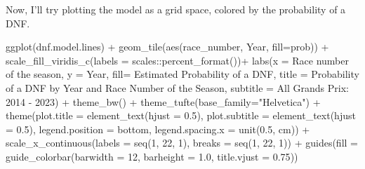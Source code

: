 \documentclass[
]{book}
\newenvironment{Shaded}{\begin{snugshade}}{\end{snugshade}}
\newcommand{\AttributeTok}[1]{\textcolor[rgb]{0.77,0.63,0.00}{#1}}
\newcommand{\DecValTok}[1]{\textcolor[rgb]{0.00,0.00,0.81}{#1}}
\newcommand{\FloatTok}[1]{\textcolor[rgb]{0.00,0.00,0.81}{#1}}
\newcommand{\FunctionTok}[1]{\textcolor[rgb]{0.00,0.00,0.00}{#1}}
\newcommand{\NormalTok}[1]{#1}
\newcommand{\SpecialCharTok}[1]{\textcolor[rgb]{0.00,0.00,0.00}{#1}}
\newcommand{\StringTok}[1]{\textcolor[rgb]{0.31,0.60,0.02}{#1}}
\begin{document}
Now, I'll try plotting the model as a grid space, colored by the probability of a DNF.

\begin{Shaded}
\begin{Highlighting}[]
\FunctionTok{ggplot}\NormalTok{(dnf.model.lines) }\SpecialCharTok{+}
  \FunctionTok{geom\_tile}\NormalTok{(}\FunctionTok{aes}\NormalTok{(race\_number, Year, }\AttributeTok{fill=}\NormalTok{prob)) }\SpecialCharTok{+}
  \FunctionTok{scale\_fill\_viridis\_c}\NormalTok{(}\AttributeTok{labels =}\NormalTok{ scales}\SpecialCharTok{::}\FunctionTok{percent\_format}\NormalTok{())}\SpecialCharTok{+}
  \FunctionTok{labs}\NormalTok{(}\AttributeTok{x =} \StringTok{\textquotesingle{}Race number of the season\textquotesingle{}}\NormalTok{, }
       \AttributeTok{y =} \StringTok{\textquotesingle{}Year\textquotesingle{}}\NormalTok{,}
       \AttributeTok{fill=} \StringTok{\textquotesingle{}Estimated Probability of a DNF\textquotesingle{}}\NormalTok{,}
       \AttributeTok{title =} \StringTok{\textquotesingle{}Probability of a DNF by Year and Race Number of the Season\textquotesingle{}}\NormalTok{,}
       \AttributeTok{subtitle =} \StringTok{\textquotesingle{}All Grands Prix: 2014 {-} 2023\textquotesingle{}}\NormalTok{) }\SpecialCharTok{+}
  \FunctionTok{theme\_bw}\NormalTok{() }\SpecialCharTok{+} 
  \FunctionTok{theme\_tufte}\NormalTok{(}\AttributeTok{base\_family=}\StringTok{"Helvetica"}\NormalTok{)  }\SpecialCharTok{+}
  \FunctionTok{theme}\NormalTok{(}\AttributeTok{plot.title =} \FunctionTok{element\_text}\NormalTok{(}\AttributeTok{hjust =} \FloatTok{0.5}\NormalTok{),}
        \AttributeTok{plot.subtitle =} \FunctionTok{element\_text}\NormalTok{(}\AttributeTok{hjust =} \FloatTok{0.5}\NormalTok{),}
        \AttributeTok{legend.position =} \StringTok{\textquotesingle{}bottom\textquotesingle{}}\NormalTok{, }
        \AttributeTok{legend.spacing.x =} \FunctionTok{unit}\NormalTok{(}\FloatTok{0.5}\NormalTok{, }\StringTok{\textquotesingle{}cm\textquotesingle{}}\NormalTok{))  }\SpecialCharTok{+}
  \FunctionTok{scale\_x\_continuous}\NormalTok{(}\AttributeTok{labels =} \FunctionTok{seq}\NormalTok{(}\DecValTok{1}\NormalTok{, }\DecValTok{22}\NormalTok{, }\DecValTok{1}\NormalTok{),}
                     \AttributeTok{breaks =} \FunctionTok{seq}\NormalTok{(}\DecValTok{1}\NormalTok{, }\DecValTok{22}\NormalTok{, }\DecValTok{1}\NormalTok{)) }\SpecialCharTok{+}
  \FunctionTok{guides}\NormalTok{(}\AttributeTok{fill =} \FunctionTok{guide\_colorbar}\NormalTok{(}\AttributeTok{barwidth =} \DecValTok{12}\NormalTok{,}
                               \AttributeTok{barheight =} \FloatTok{1.0}\NormalTok{, }
                               \AttributeTok{title.vjust =} \FloatTok{0.75}\NormalTok{)) }
\end{Highlighting}
\end{Shaded}
\end{document}
